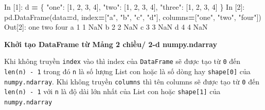 \documentclass[
]{book}
\newenvironment{Shaded}{\begin{snugshade}}{\end{snugshade}}
\newcommand{\DecValTok}[1]{\textcolor[rgb]{0.00,0.00,0.81}{#1}}
\newcommand{\NormalTok}[1]{#1}
\newcommand{\OperatorTok}[1]{\textcolor[rgb]{0.81,0.36,0.00}{\textbf{#1}}}
\newcommand{\StringTok}[1]{\textcolor[rgb]{0.31,0.60,0.02}{#1}}
\begin{document}
\begin{Shaded}
\begin{Highlighting}[]
\NormalTok{In [}\DecValTok{1}\NormalTok{]: d }\OperatorTok{=}\NormalTok{ \{}
            \StringTok{"one"}\NormalTok{: [}\DecValTok{1}\NormalTok{, }\DecValTok{2}\NormalTok{, }\DecValTok{3}\NormalTok{, }\DecValTok{4}\NormalTok{],}
            \StringTok{"two"}\NormalTok{: [}\DecValTok{1}\NormalTok{, }\DecValTok{2}\NormalTok{, }\DecValTok{3}\NormalTok{, }\DecValTok{4}\NormalTok{],}
            \StringTok{"three"}\NormalTok{: [}\DecValTok{1}\NormalTok{, }\DecValTok{2}\NormalTok{, }\DecValTok{3}\NormalTok{, }\DecValTok{4}\NormalTok{]}
\NormalTok{        \}}
\NormalTok{In [}\DecValTok{2}\NormalTok{]: pd.DataFrame(data}\OperatorTok{=}\NormalTok{d,}
\NormalTok{                     index}\OperatorTok{=}\NormalTok{[}\StringTok{"a"}\NormalTok{, }\StringTok{"b"}\NormalTok{, }\StringTok{"c"}\NormalTok{, }\StringTok{"d"}\NormalTok{],}
\NormalTok{                     columns}\OperatorTok{=}\NormalTok{[}\StringTok{"one"}\NormalTok{, }\StringTok{"two"}\NormalTok{, }\StringTok{"four"}\NormalTok{])}
\NormalTok{Out[}\DecValTok{2}\NormalTok{]:}
\NormalTok{   one  two four}
\NormalTok{a    }\DecValTok{1}    \DecValTok{1}\NormalTok{   NaN}
\NormalTok{b    }\DecValTok{2}    \DecValTok{2}\NormalTok{   NaN}
\NormalTok{c    }\DecValTok{3}    \DecValTok{3}\NormalTok{   NaN}
\NormalTok{d    }\DecValTok{4}    \DecValTok{4}\NormalTok{   NaN}
\end{Highlighting}
\end{Shaded}

\textbf{Khởi tạo DataFrame từ Mảng 2 chiều/ 2-d numpy.ndarray}

Khi không truyền \texttt{index} vào thì index của \texttt{DataFrame} sẽ được tạo từ \texttt{0} đến \texttt{len(n)\ -\ 1} trong đó \texttt{n}
là số lượng List con hoặc là số dòng hay \texttt{shape{[}0{]}} của \texttt{numpy.ndarray}. Khi không truyền \texttt{columns}
thì tên columns sẽ được tạo từ \texttt{0} đến \texttt{len(n)\ -\ 1} với \texttt{n} là độ dài lớn nhất của List con hoặc \texttt{shape{[}1{]}}
của \texttt{numpy.ndarray}
\end{document}
